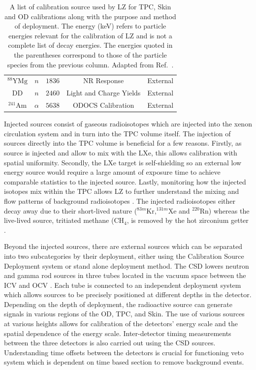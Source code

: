 \begin{table}[h!]
\begin{tabular}{|c|c|c|c|c|}
         $^{88}\text{YMg}$& $n$ & $1836$ & NR Response & External\\
         DD& $n$ & $2460$ & Light and Charge Yields & External\\
         $^{241}\text{Am}$& $\alpha$ & $5638$ &ODOCS Calibration & External\\
         \hline
    \end{tabular}
    \caption{A list of calibration source used by LZ for TPC, Skin and OD calibrations along with the purpose and method of deployment. The energy (keV) refers to particle energies relevant for the calibration of LZ and is not a complete list of decay energies. The energies quoted in the parentheses correspond to those of the particle species from the previous column. Adapted from Ref.~\cite{LZ:2024bsz,lkorley:thesis}.}
    \label{tab:LZ/CalibrationSources}
\end{table}
Injected sources consist of gaseous radioisotopes which are injected into the xenon circulation system and in turn into the TPC volume itself. The injection of sources directly into the TPC volume is beneficial for a few reasons. Firstly, as source is injected and allow to mix with the LXe, this allows calibration with spatial uniformity. Secondly, the LXe target is self-shielding so an external low energy source would require a large amount of exposure time to achieve comparable statistics to the injected source. Lastly, monitoring how the injected isotopes mix within the TPC allows LZ to further understand the mixing and flow patterns of background radioisotopes \cite{LZ:2024bsz}. The injected radioisotopes either decay away due to their short-lived nature ($^{83m}\text{Kr}$,$^{131m}\text{Xe}$ and $^{220}\text{Rn}$) whereas the live-lived source, tritiated methane ($\text{CH}_4$, is removed by the hot zirconium getter \cite{LZNIMA}.

Beyond the injected sources, there are external sources which can be separated into two subcategories by their deployment, either using the Calibration Source Deployment system or stand alone deployment method. The CSD lowers neutron and gamma rod sources in three tubes located in the vacuum space between the ICV and OCV \cite{LZNIMA}. Each tube is connected to an independent deployment system which allows sources to be precisely positioned at different depths in the detector. Depending on the depth of deployment, the radioactive source can generate signals in various regions of the OD, TPC, and Skin. The use of various sources at various heights allows for calibration of the detectors' energy scale and the spatial dependence of the energy scale. Inter-detector timing measurements between the three detectors is also carried out using the CSD sources. Understanding time offsets between the detectors is crucial for functioning veto system which is dependent on time based section to remove background events.

